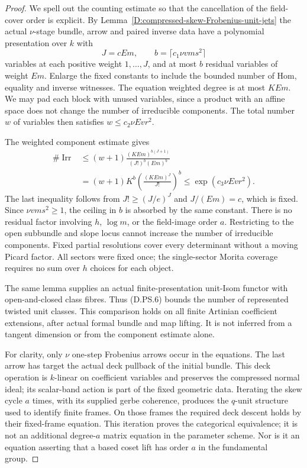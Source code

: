 \begin{proof}
We spell out the counting estimate so that the cancellation
of the field-cover order is explicit. By
Lemma~\ref{D:compressed-skew-Frobenius-unit-jets} the
actual $\nu$-stage bundle, arrow and paired inverse data
have a polynomial presentation over $k$ with
\[
 J=cEm,\qquad b=\lceil c_1\nu v m s^2\rceil             \tag{D.PS.5}
\]
variables at each positive weight $1,\ldots,J$, and at
most $b$ residual variables of weight $Em$. Enlarge
the fixed constants to include the bounded number of
Hom, equality and inverse witnesses. The equation
weighted degree is at most $KEm$. We may pad each
block with unused variables, since a product with an
affine space does not change the number of irreducible
components. The total number $w$ of variables then
satisfies $w\leq c_2\nu Ev r^2$.

The weighted component estimate gives
\[
 \begin{split}
 \#\operatorname{Irr}
 &\leq (w+1)\frac{(KEm)^{b(J+1)}}{(J!)^b(Em)^b}\\
 &=(w+1)K^b
           \left(\frac{(KEm)^J}{J!}\right)^b
 \leq\exp(c_3\nu Ev r^2).
 \end{split}                                          \tag{D.PS.6}
\]
The last inequality follows from $J!\geq(J/e)^J$ and
$J/(Em)=c$, which is fixed. Since $\nu v m s^2\geq1$,
the ceiling in $b$ is absorbed by the same constant.
There is no residual factor involving $h$, $\log m$,
or the field-image order $a$. Restricting to the open
subbundle and slope locus cannot increase the number
of irreducible components. Fixed partial resolutions
cover every determinant without a moving Picard factor.
All sectors were fixed once; the single-sector Morita
coverage requires no sum over $h$ choices for each object.

The same lemma supplies an actual finite-presentation
unit-Isom functor with open-and-closed class fibres.
Thus (D.PS.6) bounds the number of represented twisted
unit classes. This comparison holds on all finite
Artinian coefficient extensions, after actual formal
bundle and map lifting. It is not inferred from a
tangent dimension or from the component estimate alone.

For clarity, only $\nu$ one-step Frobenius arrows occur
in the equations. The last arrow has target the actual
deck pullback of the initial bundle. This deck operation
is $k$-linear on coefficient variables and preserves
the compressed normal ideal; its scalar-band action is
part of the fixed geometric data. Iterating the skew
cycle $a$ times, with its supplied gerbe coherence,
produces the $q$-unit structure used to identify finite
frames. On those frames the required deck descent holds
by their fixed-frame equation. This iteration proves
the categorical equivalence; it is not an additional
degree-$a$ matrix equation in the parameter scheme.
Nor is it an equation asserting that a based coset lift
has order $a$ in the fundamental group.


\end{proof}
